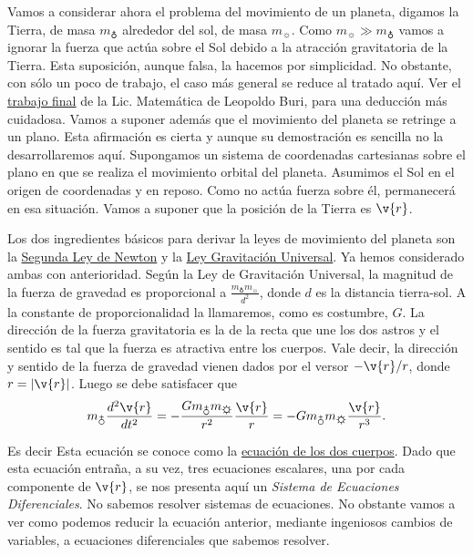 Vamos a considerar ahora el problema del movimiento de un planeta, digamos la Tierra, de masa $m_{\earth}$ alrededor del sol, de masa $m_{\sun}$. Como
$m_{\sun}\gg m_{\earth}$ vamos a ignorar la fuerza que actúa sobre el Sol debido a la atracción gravitatoria de la Tierra. Esta suposición, aunque falsa, la hacemos
por simplicidad. No obstante, con sólo un poco de trabajo, el caso más general se reduce al tratado aquí. Ver el \href{https://drive.google.com/file/d/0B80iJ0HgObRRbUtUQ2hFQ0FlTG8/view}{trabajo final} de la Lic. Matemática de Leopoldo Buri,
para una deducción más cuidadosa. Vamos a suponer además que el movimiento del planeta se retringe a un plano. Esta afirmación es cierta y aunque su demostración
es sencilla no la desarrollaremos aquí.
Supongamos un sistema de coordenadas cartesianas sobre el plano en que se realiza el movimiento orbital del planeta. Asumimos el Sol en el origen de coordenadas y en
reposo. Como no actúa fuerza sobre él, permanecerá en esa situación. Vamos a suponer que la posición de la Tierra es $\v{r}$.

Los dos ingredientes básicos para derivar la leyes de movimiento del planeta son la
\href{http://es.wikipedia.org/wiki/Leyes_de_Newton\#Segunda_ley_de_Newton_o_ley_de_fuerza}{Segunda Ley de Newton} y la
\href{http://es.wikipedia.org/wiki/Ley_de_gravitación_universal}{Ley Gravitación Universal}. Ya hemos considerado ambas con anterioridad.
Según la Ley de Gravitación Universal, la magnitud de la fuerza de gravedad es proporcional a $\frac{m_{\earth}m_{\sun}}{d^2}$, donde $d$ es la distancia tierra-sol.
A la constante de proporcionalidad la llamaremos, como es costumbre, $G$. La dirección de la fuerza gravitatoria es la de la recta que une los dos astros y
el sentido es tal que la fuerza es atractiva entre los cuerpos. Vale decir, la dirección y sentido de la
fuerza de gravedad vienen dados por el versor $-\v{r}/r$, donde $r=|\v{r}|$. Luego se debe satisfacer que
\[m_{\earth}\frac{d^2\v{r}}{dt^2}=-\frac{Gm_{\earth}m_{\sun}}{r^2}\frac{\v{r}}{r}=-Gm_{\earth}m_{\sun}\frac{\v{r}}{r^3}. \]


Es decir
Esta ecuación se conoce como la \href{http://es.wikipedia.org/wiki/Problema_de_los_dos_cuerpos}{ecuación de los dos cuerpos}.
Dado que esta ecuación entraña, a su vez, tres ecuaciones escalares, una por cada
componente de $\v{r}$, se nos presenta aquí un \emph{Sistema de Ecuaciones Diferenciales}. No sabemos resolver sistemas de ecuaciones. No obstante vamos
a ver como podemos reducir la ecuación anterior, mediante ingeniosos cambios de
variables, a ecuaciones diferenciales que sabemos resolver.


